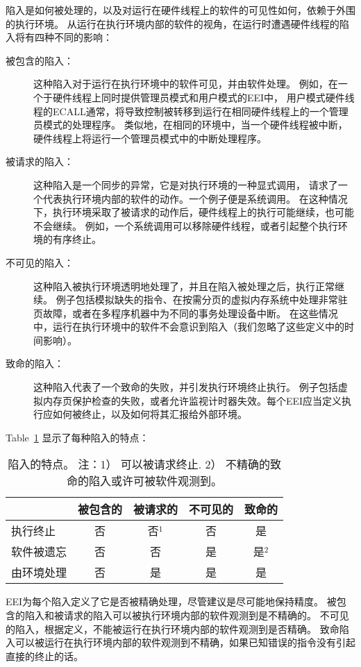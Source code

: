 陷入是如何被处理的，以及对运行在硬件线程上的软件的可见性如何，依赖于外围的执行环境。
从运行在执行环境内部的软件的视角，在运行时遭遇硬件线程的陷入将有四种不同的影响：
\begin{description}
  \item[被包含的陷入：] 这种陷入对于运行在执行环境中的软件可见，并由软件处理。
  例如，在一个于硬件线程上同时提供管理员模式和用户模式的EEI中，
  用户模式硬件线程的ECALL通常，将导致控制被转移到运行在相同硬件线程上的一个管理员模式的处理程序。
  类似地，在相同的环境中，当一个硬件线程被中断，硬件线程上将运行一个管理员模式中的中断处理程序。
  \item[被请求的陷入：] 这种陷入是一个同步的异常，它是对执行环境的一种显式调用，
  请求了一个代表执行环境内部的软件的动作。一个例子便是系统调用。
  在这种情况下，执行环境采取了被请求的动作后，硬件线程上的执行可能继续，也可能不会继续。
  例如，一个系统调用可以移除硬件线程，或者引起整个执行环境的有序终止。
  \item[不可见的陷入：] 这种陷入被执行环境透明地处理了，并且在陷入被处理之后，执行正常继续。
  例子包括模拟缺失的指令、在按需分页的虚拟内存系统中处理非常驻页故障，或者在多程序机器中为不同的事务处理设备中断。
  在这些情况中，运行在执行环境中的软件不会意识到陷入（我们忽略了这些定义中的时间影响）。
  \item[致命的陷入：] 这种陷入代表了一个致命的失败，并引发执行环境终止执行。
  例子包括虚拟内存页保护检查的失败，或者允许监视计时器失效。每个EEI应当定义执行应如何被终止，以及如何将其汇报给外部环境。
\end{description}

Table~\ref{table:trapcharacteristics} 显示了每种陷入的特点：

\begin{table}[hbt]
  \centering
  \begin{tabular}{|l|c|c|c|c|}
      \hline
                & 被包含的 & 被请求的 & 不可见的 & 致命的\\
      \hline
      执行终止   & 否     & 否$^{1}$ & 否  & 是 \\
      软件被遗忘 & 否     & 否       & 是 & 是$^{2}$ \\
      由环境处理 & 否     & 是       & 是 & 是 \\
      \hline
  \end{tabular}
  \caption{陷入的特点。 注：1） 可以被请求终止. 2） 不精确的致命的陷入或许可被软件观测到。}
\label{table:trapcharacteristics}
\end{table}

EEI为每个陷入定义了它是否被精确处理，尽管建议是尽可能地保持精度。
被包含的陷入和被请求的陷入可以被执行环境内部的软件观测到是不精确的。
不可见的陷入，根据定义，不能被运行在执行环境内部的软件观测到是否精确。
致命陷入可以被运行在执行环境内部的软件观测到不精确，如果已知错误的指令没有引起直接的终止的话。

